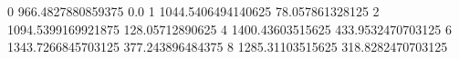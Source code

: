 0 966.4827880859375 0.0
1 1044.5406494140625 78.057861328125
2 1094.5399169921875 128.05712890625
4 1400.43603515625 433.9532470703125
6 1343.7266845703125 377.243896484375
8 1285.31103515625 318.8282470703125
